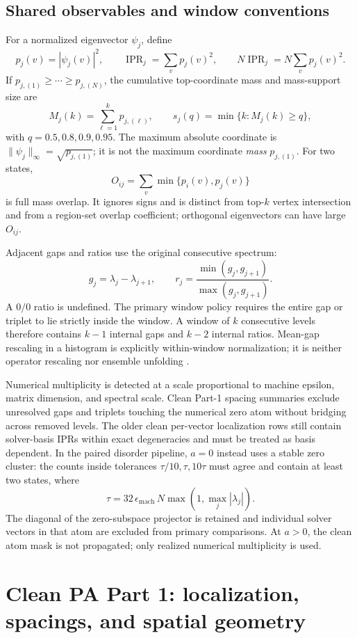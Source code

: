 \documentclass[11pt]{article}
\begin{document}
\subsection{Shared observables and window conventions}

For a normalized eigenvector \(\psi_j\), define
\[
 p_j(v)=|\psi_j(v)|^2,\qquad
 \operatorname{IPR}_j=\sum_v p_j(v)^2,\qquad
 N\operatorname{IPR}_j=N\sum_v p_j(v)^2.
\]
If \(p_{j,(1)}\geq\cdots\geq p_{j,(N)}\), the cumulative top-coordinate mass and mass-support size are
\[
 M_j(k)=\sum_{\ell=1}^k p_{j,(\ell)},\qquad
 s_j(q)=\min\{k:M_j(k)\geq q\},
\]
with \(q=0.5,0.8,0.9,0.95\).  The maximum absolute coordinate is
\(\lVert\psi_j\rVert_\infty=\sqrt{p_{j,(1)}}\); it is not the maximum coordinate \emph{mass} \(p_{j,(1)}\).  For two states,
\[
 O_{ij}=\sum_v\min\{p_i(v),p_j(v)\}
\]
is full mass overlap.  It ignores signs and is distinct from top-\(k\) vertex intersection and from a region-set overlap coefficient; orthogonal eigenvectors can have large \(O_{ij}\).

Adjacent gaps and ratios use the original consecutive spectrum:
\[
 g_j=\lambda_j-\lambda_{j+1},\qquad
 r_j=\frac{\min(g_j,g_{j+1})}{\max(g_j,g_{j+1})}.
\]
A \(0/0\) ratio is undefined.  The primary window policy requires the entire gap or triplet to lie strictly inside the window.  A window of \(k\) consecutive levels therefore contains \(k-1\) internal gaps and \(k-2\) internal ratios.  Mean-gap rescaling in a histogram is explicitly within-window normalization; it is neither operator rescaling nor ensemble unfolding \cite{AtasEtAl2013}.

Numerical multiplicity is detected at a scale proportional to machine epsilon, matrix dimension, and spectral scale.  Clean Part-1 spacing summaries exclude unresolved gaps and triplets touching the numerical zero atom without bridging across removed levels.  The older clean per-vector localization rows still contain solver-basis IPRs within exact degeneracies and must be treated as basis dependent.  In the paired disorder pipeline, \(a=0\) instead uses a stable zero cluster: the counts inside tolerances \(\tau/10,\tau,10\tau\) must agree and contain at least two states, where
\[
 \tau=32\,\epsilon_{\mathrm{mach}}\,N\max(1,\max_j|\lambda_j|).
\]
The diagonal of the zero-subspace projector is retained and individual solver vectors in that atom are excluded from primary comparisons.  At \(a>0\), the clean atom mask is not propagated; only realized numerical multiplicity is used.

\section{Clean PA Part 1: localization, spacings, and spatial geometry}
\end{document}

